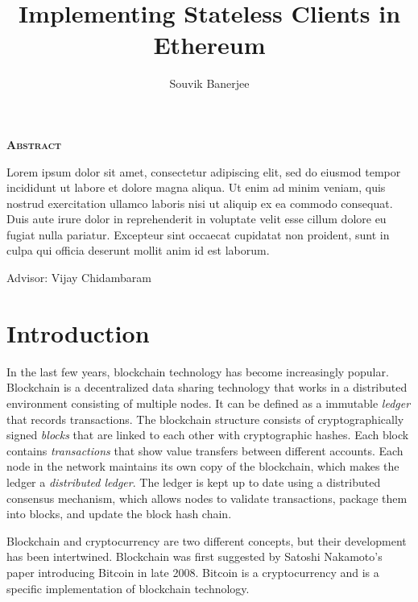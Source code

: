 \documentclass[12pt]{article}
\title{Implementing Stateless Clients in Ethereum}
\author{Souvik Banerjee}
\date{}
\begin{document}
\maketitle
\thispagestyle{empty}

\begin{center}
  \textsc{\textbf{Abstract}}
\end{center}
Lorem ipsum dolor sit amet, consectetur adipiscing elit, sed do eiusmod tempor incididunt ut labore et dolore magna aliqua. Ut enim ad minim veniam, quis nostrud exercitation ullamco laboris nisi ut aliquip ex ea commodo consequat. Duis aute irure dolor in reprehenderit in voluptate velit esse cillum dolore eu fugiat nulla pariatur. Excepteur sint occaecat cupidatat non proident, sunt in culpa qui officia deserunt mollit anim id est laborum. %

\par\bigskip\noindent\vspace{3in}
\begin{center}
  Advisor: Vijay Chidambaram
\end{center}

\newpage
\thispagestyle{empty}
\tableofcontents

\newpage



\section{Introduction}


In the last few years, blockchain technology has become increasingly popular.
Blockchain is a decentralized data sharing technology that works in a distributed environment consisting of multiple nodes. It can be defined as a immutable \emph{ledger} that records transactions. The blockchain structure consists of cryptographically signed \emph{blocks} that are linked to each other with cryptographic hashes. Each block contains \emph{transactions} that show value transfers between different accounts. Each node in the network maintains its own copy of the blockchain, which makes the ledger a \emph{distributed ledger}. The ledger is kept up to date using a distributed consensus mechanism, which allows nodes to validate transactions, package them into blocks, and update the block hash chain.

Blockchain and cryptocurrency are two different concepts, but their development has been intertwined. Blockchain was first suggested by Satoshi Nakamoto's paper introducing Bitcoin in late 2008. Bitcoin is a cryptocurrency and is a specific implementation of blockchain technology.
\end{document}
